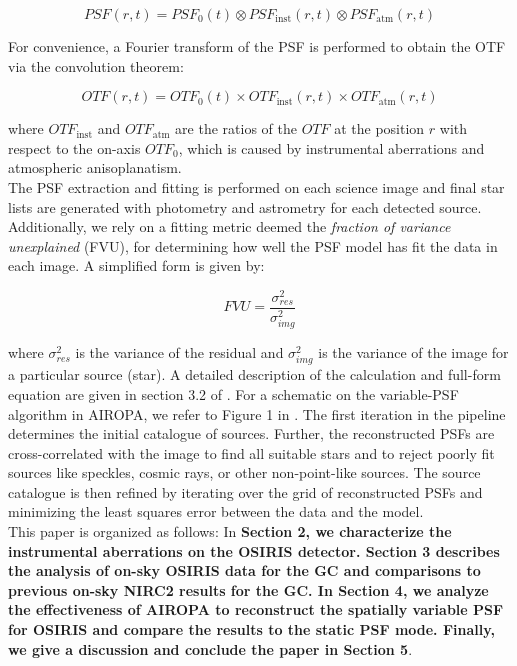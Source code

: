 \documentclass[]{spie}  %
\begin{document}
\begin{equation}
    PSF(r,t) = PSF_{0}(t) \otimes PSF_{\textrm{inst}}(r,t) \otimes PSF_{\textrm{atm}}(r,t)
\end{equation}

\noindent For convenience, a Fourier transform of the PSF is performed to obtain the OTF via the convolution theorem:

\begin{equation}
    OTF(r,t) = OTF_{0}(t) \times OTF_{\textrm{inst}}(r,t) \times OTF_{\textrm{atm}}(r,t)
\end{equation}

\noindent where $OTF_{\textrm{inst}}$ and $OTF_{\textrm{atm}}$ are the ratios of the $OTF$ at the position $r$ with respect to the on-axis $OTF_{0}$, which is caused by instrumental aberrations and atmospheric anisoplanatism.
\\
\indent The PSF extraction and fitting is performed on each science image and final star lists are generated with photometry and astrometry for each detected source. Additionally, we rely on a fitting metric deemed the \textit{fraction of variance unexplained} (FVU), for determining how well the PSF model has fit the data in each image. A simplified form is given by:

\begin{equation}
    FVU = \frac{\sigma^{2}_{res}}{\sigma^{2}_{img}}
\end{equation}

\noindent where $\sigma^{2}_{res}$ is the variance of the residual and $\sigma^{2}_{img}$ is the variance of the image for a particular source (star). A detailed description of the calculation and full-form equation are given in section 3.2 of \cite{Ciurlo:inprep}.
For a schematic on the variable-PSF algorithm in AIROPA, we refer to Figure 1 in \cite{turri:2022}. The first iteration in the pipeline determines the initial catalogue of sources. Further, the reconstructed PSFs are cross-correlated with the image to find all suitable stars and to reject poorly fit sources like speckles, cosmic rays, or other non-point-like sources. The source catalogue is then refined by iterating over the grid of reconstructed PSFs and minimizing the least squares error between the data and the model.
\\
\indent This paper is organized as follows: In \textbf{Section 2, we characterize the instrumental aberrations on the OSIRIS detector. Section 3 describes the analysis of on-sky OSIRIS data for the GC and comparisons to previous on-sky NIRC2 results for the GC. In Section 4, we analyze the effectiveness of AIROPA to reconstruct the spatially variable PSF for OSIRIS and compare the results to the static PSF mode. Finally, we give a discussion and conclude the paper in Section 5}.
\end{document}
